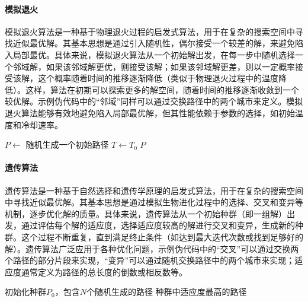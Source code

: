 \paragraph{模拟退火} 模拟退火算法是一种基于物理退火过程的启发式算法，用于在复杂的搜索空间中寻找近似最优解。其基本思想是通过引入随机性，偶尔接受一个较差的解，来避免陷入局部最优。具体来说，模拟退火算法从一个初始解出发，在每一步中随机选择一个邻域解，如果该邻域解更优，则接受该解；如果该邻域解更差，则以一定概率接受该解，这个概率随着时间的推移逐渐降低（类似于物理退火过程中的温度降低）。这样，算法在初期可以探索更多的解空间，随着时间的推移逐渐收敛到一个较优解。示例伪代码中的“邻域”同样可以通过交换路径中的两个城市来定义。模拟退火算法能够有效地避免陷入局部最优解，但其性能依赖于参数的选择，如初始温度和冷却速率。

\begin{algorithm}[htbp]
    \caption{模拟退火算法解决TSP问题的伪代码}\label{alg:simulated-annealing}
    $P \leftarrow$ 随机生成一个初始路径\;
    $T \leftarrow T_0$\;
    \Return $P$\;
\end{algorithm}

\paragraph{遗传算法} 遗传算法是一种基于自然选择和遗传学原理的启发式算法，用于在复杂的搜索空间中寻找近似最优解。其基本思想是通过模拟生物进化过程中的选择、交叉和变异等机制，逐步优化解的质量。具体来说，遗传算法从一个初始种群（即一组解）出发，通过评估每个解的适应度，选择适应度较高的解进行交叉和变异，生成新的种群。这个过程不断重复，直到满足终止条件（如达到最大迭代次数或找到足够好的解）。遗传算法广泛应用于各种优化问题，示例伪代码中的“交叉”可以通过交换两个路径的部分片段来实现，“变异”可以通过随机交换路径中的两个城市来实现；适应度通常定义为路径的总长度的倒数或相反数等。

\begin{algorithm}[htbp]
    \caption{遗传算法解决TSP问题的伪代码}\label{alg:genetic-algorithm}
    初始化种群$P_0$，包含$N$个随机生成的路径\;
    \Return 种群中适应度最高的路径\;
\end{algorithm}

